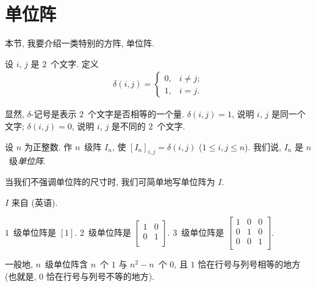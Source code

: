 \documentclass[../libro.tex]{subfiles}
\begin{document}

\section{单位阵}

本节, 我要介绍一类特别的方阵, 单位阵.

\begin{definition}[\(\delta\)-记号]
    设 \(i\), \(j\) 是 \(2\)~个文字.
    定义
    \begin{align*}
        \delta(i, j) =
        \begin{cases}
            0, & i \neq j; \\
            1, & i = j.
        \end{cases}
    \end{align*}
\end{definition}

显然, \(\delta\)-记号是表示 \(2\)~个文字是否相等的一个量.
\(\delta(i, j) = 1\), 说明 \(i\), \(j\) 是同一个文字;
\(\delta(i, j) = 0\), 说明 \(i\), \(j\) 是不同的 \(2\)~个文字.

\begin{definition}[单位阵]
    设 \(n\) 为正整数.
    作 \(n\)~级阵 \(I_n\),
    使 \([I_n]_{i,j} = \delta(i, j)\)
    (\(1 \leq i, j \leq n\)).
    我们说, \(I_n\) 是 \(n\)~级\emph{单位阵}.

    当我们不强调单位阵的尺寸时,
    我们可简单地写单位阵为 \(I\).
\end{definition}

\(I\) 来自  (英语).

\begin{example}
    \(1\)~级单位阵是 \([1]\).
    \(2\)~级单位阵是
    \(
        \begin{bmatrix}
            1 & 0 \\
            0 & 1 \\
        \end{bmatrix}.
    \)
    \(3\)~级单位阵是
    \(
        \begin{bmatrix}
            1 & 0 & 0 \\
            0 & 1 & 0 \\
            0 & 0 & 1 \\
        \end{bmatrix}.
    \)

    一般地, \(n\)~级单位阵含 \(n\)~个 \(1\)
    与 \(n^2 - n\)~个 \(0\),
    且 \(1\) 恰在行号与列号相等的地方
    (也就是, \(0\) 恰在行号与列号不等的地方).
\end{example}
\end{document}
